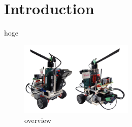 \section{Introduction}\label{section:intro}

hoge\cite{bib:HELMHOLTZ_FURUSHO_EN}

\begin{figure}[tbp]   
  \centering   
  \includegraphics[width=0.48\textwidth]{img/template.pdf}
  \caption{overview}
  \label{fig:template}
\end{figure}                                                                                                             
                 
